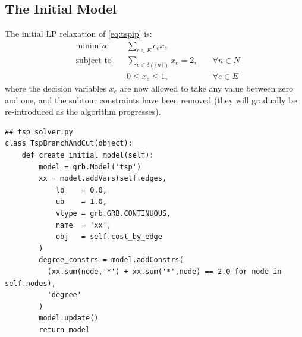 \documentclass{article}
\begin{document}
\subsection{The Initial Model}
\begin{flushleft}

The initial LP relaxation of \eqref{eq:tspip} is:
\begin{equation} \label{eq:tsplpinit}
\begin{alignedat}{3}
 & \text{minimize}         & \sum_{e \in E}{c_e x_e} & \\
 & \text{subject to} \quad & \sum_{e \in \delta(\{n\})}{x_e} = 2, \quad & \forall n \in N \\
 &                         & 0 \leq x_e \leq 1, \quad                     & \forall e \in E
\end{alignedat}
\end{equation}
where the decision variables $x_e$
are now allowed to take any value
between zero and one,
and the subtour constraints
have been removed
(they will gradually be re-introduced
as the algorithm progresses).

\begin{lstlisting}
## tsp_solver.py
class TspBranchAndCut(object):
    def create_initial_model(self):
        model = grb.Model('tsp')
        xx = model.addVars(self.edges,
            lb    = 0.0,
            ub    = 1.0,
            vtype = grb.GRB.CONTINUOUS,
            name  = 'xx',
            obj   = self.cost_by_edge
        )
        degree_constrs = model.addConstrs(
          (xx.sum(node,'*') + xx.sum('*',node) == 2.0 for node in self.nodes),
          'degree'
        )
        model.update()
        return model
\end{lstlisting}

\end{flushleft}
\end{document}
